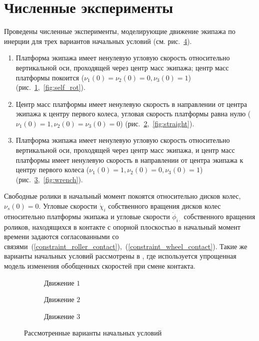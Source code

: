 
\section{Численные эксперименты}

Проведены численные эксперименты, моделирующие движение экипажа по инерции для трех вариантов начальных условий (см. рис.~\ref{fig:nu_impact}).
\begin{enumerate}[wide]
    \item \label{sol:self_rot} Платформа экипажа имеет ненулевую угловую скорость относительно вертикальной оси, проходящей через центр масс экипажа; центр масс платформы покоится ($\nu_1(0) = \nu_2(0) = 0, \nu_3(0) = 1$) (рис.~\ref{fig:nu_impact_1},~\ref{fig:self_rot}).
    \item \label{sol:straight} Центр масс платформы имеет ненулевую скорость в направлении от центра экипажа к центру первого колеса, угловая скорость платформы равна нулю ($\nu_1(0) = 1, \nu_2(0) = \nu_3(0) = 0$) (рис.~\ref{fig:nu_impact_2},~\ref{fig:straight}).
    \item \label{sol:wrench} Платформа экипажа имеет ненулевую угловую скорость относительно вертикальной оси, проходящей через центр масс экипажа, и центр масс платформы имеет ненулевую скорость в направлении от центра экипажа к центру первого колеса ($\nu_1(0) = 1, \nu_2(0) = 0, \nu_3(0) = 1$) (рис.~\ref{fig:nu_impact_3},~\ref{fig:wrench}).
\end{enumerate}
Свободные ролики в начальный момент покоятся относительно дисков колес, $\nu_s(0) = 0$. Угловые скорости $\dot{\chi}_i$ собственного вращения дисков колес относительно платформы экипажа и угловые скорости $\dot{\phi}_{i\cdot}$ собственного вращения роликов, находящихся в контакте с опорной плоскостью в начальный момент времени задаются согласованными со связями~(\ref{constraint_roller_contact}),~(\ref{constraint_wheel_contact}). Такие же варианты начальных условий рассмотрены в \cite{GerasimovZobovaPMM2018}, где используется упрощенная модель изменения обобщенных скоростей при смене контакта.


\begin{figure}
    \centering
    \begin{subfigure}[t]{0.3\textwidth}
        \centering
        \caption{Движение $1$}
        \label{fig:nu_impact_1}
    \end{subfigure}
    \quad
    \begin{subfigure}[t]{0.3\textwidth}
        \centering
        \caption{Движение $2$}
        \label{fig:nu_impact_2}
    \end{subfigure}
    \quad
    \begin{subfigure}[t]{0.3\textwidth}
        \centering
        \caption{Движение $3$}
        \label{fig:nu_impact_3}
    \end{subfigure}
    \caption{Рассмотренные варианты начальных условий}
    \label{fig:nu_impact}
\end{figure}
    
